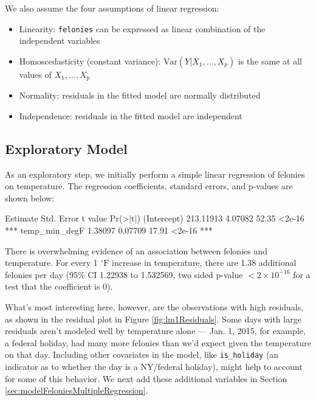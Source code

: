 \documentclass[11pt,notitlepage]{article}
\newenvironment{codeSmall}%
   {\par\noindent\adjustbox{margin=1ex,bgcolor=shadecolor,margin=0ex \medskipamount}\bgroup\minipage\linewidth\verbatim\footnotesize}%
   {\endverbatim\endminipage\egroup}
\newcommand{\degf}{^\circ\text{F}}
\begin{document}
We also assume the four assumptions of linear regression:
\begin{itemize}
\setlength\itemsep{-1pt}

\item Linearity: \texttt{felonies} can be expressed as linear combination of the independent variables
\item Homoscedasticity (constant variance): $\text{Var}(Y|X_1,\ldots, X_p)$ is the same at all values of $X_1,\ldots, X_p$
\item Normality: residuals in the fitted model are normally distributed
\item Independence: residuals in the fitted model are independent
\end{itemize}


\subsection{Exploratory Model}
\label{sec:feloniesExploratoryModel}

As an exploratory step, we initially perform a simple linear regression of felonies on temperature. The regression coefficients, standard errors, and p-values are shown below: 

\begin{codeSmall}
               Estimate Std. Error t value Pr(>|t|)    
(Intercept)   213.11913    4.07082   52.35   <2e-16 ***
temp_min_degF   1.38097    0.07709   17.91   <2e-16 ***
\end{codeSmall}


There is overwhelming evidence of an association between felonies and temperature. For every 1 $\degf$ increase in temperature, there are 1.38 additional felonies per day (95\% CI 1.22938 to 1.532569, two sided p-value $<2\times10^{-16}$ for a test that the coefficient is 0).

What's most interesting here, however, are the observations with high residuals, as shown in the residual plot in Figure \ref{fig:lm1Residuals}. Some days with large residuals aren't modeled well by temperature alone --- Jan. 1, 2015, for example, a federal holiday, had many more felonies than we'd expect given the temperature on that day. Including other covariates in the model, like \texttt{is_holiday} (an indicator as to whether the day is a NY/federal holiday), might help to account for some of this behavior. We next add these additional variables in Section \ref{sec:modelFeloniesMultipleRegression}.
\end{document}
